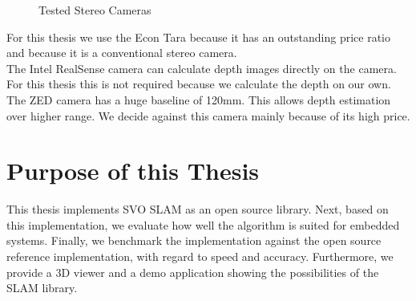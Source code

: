 \documentclass[11pt,a4paper,titlepage,oneside]{report}
\begin{document}
\begin{figure}[H]
  \centering
  \caption{Tested Stereo Cameras}\label{fig:cameras}
\end{figure}


For this thesis we use the Econ Tara because it has an outstanding price ratio and because it is a conventional stereo camera.\\
The Intel RealSense camera can calculate depth images directly on the camera. For this thesis this is not required because we calculate the depth on our own.\\
The ZED camera has a huge baseline of 120mm. This allows depth estimation over higher range. We decide against this camera mainly because of its high price.

\section{Purpose of this Thesis}

This thesis implements SVO SLAM as an open source library. Next, based on this implementation, we evaluate how well the algorithm is suited for embedded systems. Finally, we benchmark the implementation against the open source reference implementation, with regard to speed and accuracy. Furthermore, we provide a 3D viewer and a demo application showing the possibilities of the SLAM library.
\end{document}
